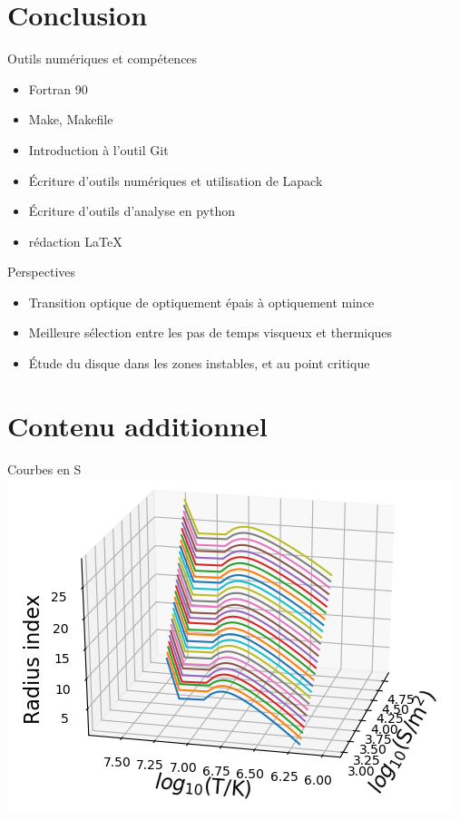 \documentclass{beamer}
\begin{document}
\section{Conclusion}
\begin{frame}{Outils numériques et compétences}
\begin{itemize}
\item Fortran 90
\item Make, Makefile
\item Introduction à l'outil Git
\item Écriture d'outils numériques et utilisation de Lapack
\item Écriture d'outils d'analyse en python
\item rédaction \LaTeX
\end{itemize}
\end{frame}


\begin{frame}{Perspectives}
\begin{itemize}
\item Transition optique de optiquement épais à optiquement mince
\item Meilleure sélection entre les pas de temps visqueux et thermiques
\item Étude du disque dans les zones instables, et au point critique
\end{itemize}

\end{frame}



\section{Contenu additionnel}
  \begin{frame}{Courbes en S}
    \centering
    \includegraphics[width=0.7\linewidth]{3D_SCurves_magnified.png}
  \end{frame}
\end{document}
